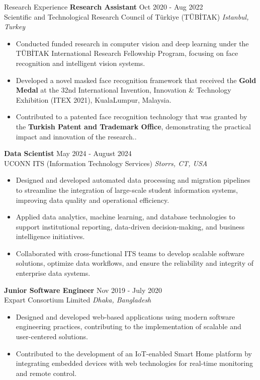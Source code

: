 \begin{rSection}{Research Experience}
{\bf Research Assistant} \hfill { Oct 2020 - Aug 2022}
\\
Scientific and Technological Research Council of Türkiye (TÜBİTAK) \hfill \textit{Istanbul, Turkey}

 \begin{itemize}
    \itemsep -3pt {} 
     \item Conducted funded research in computer vision and deep learning under the TÜBİTAK International Research Fellowship Program, focusing on face recognition and intelligent vision systems.
     \item Developed a novel masked face recognition framework that received the \textbf{Gold Medal} at the 32nd International Invention, Innovation \& Technology Exhibition (ITEX 2021), KualaLumpur, Malaysia.
     \item Contributed to a patented face recognition technology that was granted by the \textbf{Turkish Patent and Trademark Office}, demonstrating the practical impact and innovation of the research..
 \end{itemize}

{\bf Data Scientist} \hfill { May 2024 - August 2024}
\\ 
UCONN ITS (Information Technology Services) \hfill \textit{Storrs, CT, USA}

 \begin{itemize}
    \itemsep -3pt {} 
     \item Designed and developed automated data processing and migration pipelines to streamline the integration of large-scale student information systems, improving data quality and operational efficiency.
     \item Applied data analytics, machine learning, and database technologies to support institutional reporting, data-driven decision-making, and business intelligence initiatives.
     \item Collaborated with cross-functional ITS teams to develop scalable software solutions, optimize data workflows, and ensure the reliability and integrity of enterprise data systems.
 \end{itemize}

{\bf Junior Software Engineer} \hfill { Nov 2019 - July 2020}
\\ 
Expart Consortium Limited \hfill \textit{Dhaka, Bangladesh}

 \begin{itemize}
    \itemsep -3pt {} 
     \item Designed and developed web-based applications using modern software engineering practices, contributing to the implementation of scalable and user-centered solutions.
     \item Contributed to the development of an IoT-enabled Smart Home platform by integrating embedded devices with web technologies for real-time monitoring and remote control.
 \end{itemize}


\end{rSection}
